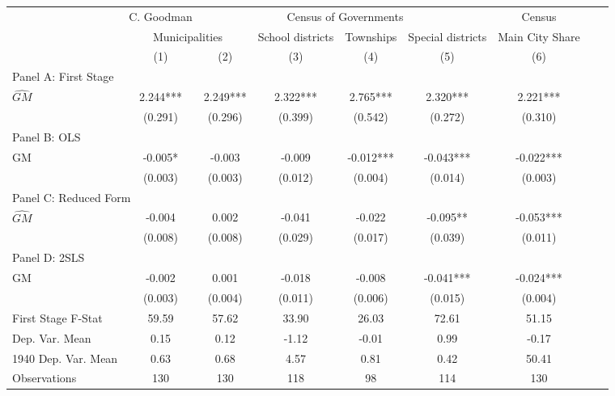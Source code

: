  \begin{tabular}{l*{8}{c}} \toprule
&\multicolumn{1}{c}{C. Goodman}&\multicolumn{4}{c}{Census of Governments}&\multicolumn{1}{c}{Census}\\\cmidrule(lr){2-2}\cmidrule(lr){3-6}\cmidrule(lr){7-7}
&\multicolumn{2}{c}{Municipalities}&\multicolumn{1}{c}{School districts}&\multicolumn{1}{c}{Townships}&\multicolumn{1}{c}{Special districts}&\multicolumn{1}{c}{Main City Share}\\\cmidrule(lr){2-3}\cmidrule(lr){4-6}\cmidrule(lr){7-7}
&\multicolumn{1}{c}{(1)}&\multicolumn{1}{c}{(2)}&\multicolumn{1}{c}{(3)}&\multicolumn{1}{c}{(4)}&\multicolumn{1}{c}{(5)}&\multicolumn{1}{c}{(6)}\\
\cmidrule(lr){1-7}
\multicolumn{6}{l}{Panel A: First Stage}\\
\cmidrule(lr){1-7}
$\widehat{GM}$  &    2.244***&    2.249***&    2.322***&    2.765***&    2.320***&    2.221***\\
                &  (0.291)   &  (0.296)   &  (0.399)   &  (0.542)   &  (0.272)   &  (0.310)   \\
\cmidrule(lr){1-7}
\multicolumn{6}{l}{Panel B: OLS}\\
\cmidrule(lr){1-7}
GM              &   -0.005*  &   -0.003   &   -0.009   &   -0.012***&   -0.043***&   -0.022***\\
                &  (0.003)   &  (0.003)   &  (0.012)   &  (0.004)   &  (0.014)   &  (0.003)   \\
\cmidrule(lr){1-7}
\multicolumn{6}{l}{Panel C: Reduced Form}\\
\cmidrule(lr){1-7}
$\widehat{GM}$  &   -0.004   &    0.002   &   -0.041   &   -0.022   &   -0.095** &   -0.053***\\
                &  (0.008)   &  (0.008)   &  (0.029)   &  (0.017)   &  (0.039)   &  (0.011)   \\
\cmidrule(lr){1-7}
\multicolumn{6}{l}{Panel D: 2SLS}\\
\cmidrule(lr){1-7}
GM              &   -0.002   &    0.001   &   -0.018   &   -0.008   &   -0.041***&   -0.024***\\
                &  (0.003)   &  (0.004)   &  (0.011)   &  (0.006)   &  (0.015)   &  (0.004)   \\
\midrule
First Stage F-Stat&    59.59   &    57.62   &    33.90   &    26.03   &    72.61   &    51.15   \\
Dep. Var. Mean  &     0.15   &     0.12   &    -1.12   &    -0.01   &     0.99   &    -0.17   \\
1940 Dep. Var. Mean&     0.63   &     0.68   &     4.57   &     0.81   &     0.42   &    50.41   \\
Observations    &      130   &      130   &      118   &       98   &      114   &      130   \\
       \bottomrule \end{tabular}
